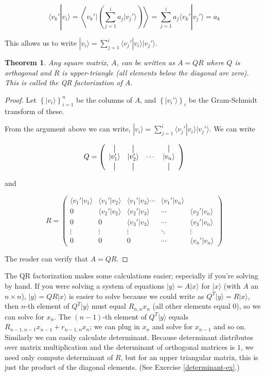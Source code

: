 \documentclass{amsbook}
\newcommand*{\vertbar}{\rule[-1ex]{0.5pt}{2.5ex}}
\newtheorem{theorem}{Theorem}
\begin{document}
$$
\langle v_k'|v_i\rangle=\left\langle v_k'|\left(\sum_{j=1}^i a_j|v_j'\rangle\right)\right\rangle=\sum_{j=1}^i a_j \langle v_k'|v_j'\rangle=a_k
$$

This allows us to write $|v_i\rangle=\sum_{j=1}^i \langle v_j'|v_i\rangle |v_j'\rangle$.

\begin{theorem}\label{QR-exist}
Any square matrix, $A$, can be written as $A=QR$ where $Q$ is orthogonal and $R$ is upper-triangle (all elements below the diagonal are zero).  This is called the {\em QR factorization} of $A$.
\end{theorem}

\begin{proof}
Let $\left\{|v_i\rangle\right\}_{i=1}^n$ be the columns of $A$, and $\left\{|v_i'\rangle\right\}_i$ be the Gram-Schmidt transform of these.

From the argument above we can write, $|v_i\rangle=\sum_{j=1}^i \langle v_j'|v_i\rangle |v_j'\rangle$.  We can write

$$
Q = \left(
  \begin{array}{cccc}
    \vertbar & \vertbar & & \vertbar \\
    |v_1'\rangle & |v_2'\rangle & \cdots & |v_n\rangle    \\
    \vertbar & \vertbar & & \vertbar 
  \end{array}
\right)
$$

and

$$
R = \left(\begin{array}{ccccc}
  \langle v_1'|v_1\rangle & \langle v_1'|v_2\rangle & \langle v_1'|v_3\rangle \cdots & \langle v_1'|v_n\rangle \\
  0 & \langle v_2'|v_2\rangle & \langle v_2'|v_3\rangle & \cdots & \langle v_2'|v_n\rangle \\
  0 & 0 & \langle v_3'|v_3\rangle & \cdots & \langle v_3'|v_n\rangle \\
  \vdots & \vdots & \vdots & \ddots & \vdots \\
  0 & 0 & 0 & \cdots & \langle v_n'|v_n\rangle
\end{array}\right)
$$

The reader can verify that $A=QR$.
\end{proof}

The QR factorization makes some calculations easier; especially if you're solving by hand.  If you were solving a system of equations $|y\rangle=A|x\rangle$ for $|x\rangle$ (with $A$ an $n\times n$), $|y\rangle=QR|x\rangle$ is easier to solve because we could write as $Q^T|y\rangle=R|x\rangle$, then $n$-th element of $Q^T|y\rangle$ must equal $R_{n,n}x_n$ (all other elements equal $0$), so we can solve for $x_n$.  The $(n-1)$-th element of $Q^T|y\rangle$ equals $R_{n-1,n-1}x_{n-1}+r_{n-1,n}x_n$; we can plug in $x_n$ and solve for $x_{n-1}$ and so on.  Similarly we can easily calculate determinant.  Because determinant distributes over matrix multiplication and the determinant of orthogonal matrices is $1$, we need only compute determinant of $R$, but for an upper triangular matrix, this is just the product of the diagonal elements.  (See Exercise \ref{determinant-ex}.)
\end{document}
